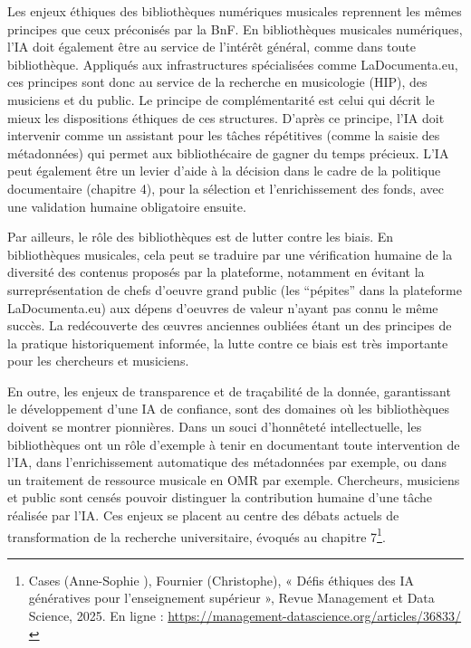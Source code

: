 Les enjeux éthiques des bibliothèques numériques musicales reprennent les mêmes principes que ceux préconisés par la BnF. 
En bibliothèques musicales numériques, l’IA doit également être au service de l’intérêt général, comme dans toute bibliothèque. Appliqués aux infrastructures spécialisées comme LaDocumenta.eu, ces principes sont donc au service de la recherche en musicologie (HIP), des musiciens et du public. Le principe de complémentarité est celui qui décrit le mieux les dispositions éthiques de ces structures. D'après ce principe, l’IA doit intervenir comme un assistant pour les tâches répétitives (comme la saisie des métadonnées) qui permet aux bibliothécaire de gagner du temps précieux. L’IA peut également être un levier d’aide à la décision dans le cadre de la politique documentaire (chapitre 4), pour la sélection et l’enrichissement des fonds, avec une validation humaine obligatoire ensuite.



Par ailleurs, le rôle des bibliothèques est de lutter contre les biais. En bibliothèques musicales, cela peut se traduire par une vérification humaine de la diversité des contenus proposés par la plateforme, notamment en évitant la surreprésentation de chefs d’oeuvre grand public (les \enquote{pépites} dans la plateforme LaDocumenta.eu) aux dépens d’oeuvres de valeur n’ayant pas connu le même succès. La redécouverte des œuvres anciennes oubliées étant un des principes de la pratique historiquement informée, la lutte contre ce biais est très importante pour les chercheurs et musiciens.



En outre, les enjeux de transparence et de traçabilité de la donnée, garantissant le développement d’une IA de confiance, sont des domaines où les bibliothèques doivent se montrer pionnières. Dans un souci d’honnêteté intellectuelle, les bibliothèques ont un rôle d’exemple à tenir en documentant toute intervention de l’IA, dans l’enrichissement automatique des métadonnées par exemple, ou dans un traitement de ressource musicale en OMR par exemple. Chercheurs, musiciens et public sont censés pouvoir distinguer la contribution humaine d’une tâche réalisée par l’IA. Ces enjeux se placent au centre des débats actuels de transformation de la recherche universitaire, évoqués au chapitre 7\footnote{Cases (Anne-Sophie ), Fournier (Christophe), « Défis éthiques des IA génératives pour l’enseignement supérieur », Revue Management et Data Science, 2025. En ligne : \url{https://management-datascience.org/articles/36833/}}.



